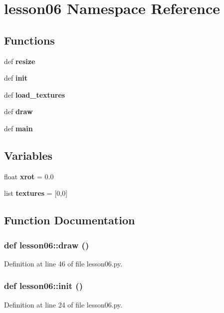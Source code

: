\section{lesson06 Namespace Reference}
\label{namespacelesson06}


\subsection*{Functions}
\begin{CompactItemize}
\item 
def {\bf resize}
\item 
def {\bf init}
\item 
def {\bf load\_\-textures}
\item 
def {\bf draw}
\item 
def {\bf main}
\end{CompactItemize}
\subsection*{Variables}
\begin{CompactItemize}
\item 
float {\bf xrot} = 0.0
\item 
list {\bf textures} = [0,0]
\end{CompactItemize}


\subsection{Function Documentation}
\subsubsection{\setlength{\rightskip}{0pt plus 5cm}def lesson06::draw ()}\label{namespacelesson06_88e20ba3b88da8ef980acd7d19549353}




Definition at line 46 of file lesson06.py.
\subsubsection{\setlength{\rightskip}{0pt plus 5cm}def lesson06::init ()}\label{namespacelesson06_89628d336641eda3235fced054a613dc}




Definition at line 24 of file lesson06.py.
